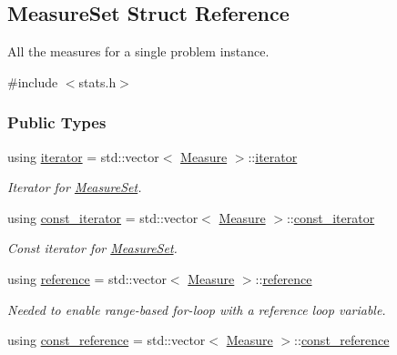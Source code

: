 \hypertarget{structMeasureSet}{}\subsection{Measure\+Set Struct Reference}
\label{structMeasureSet}


All the measures for a single problem instance.  




{\ttfamily \#include $<$stats.\+h$>$}

\subsubsection*{Public Types}
\begin{DoxyCompactItemize}
\item 
using \hyperlink{structMeasureSet_ae27132ddda27621abc1178a3fb3744b3}{iterator} = std\+::vector$<$ \hyperlink{structMeasure}{Measure} $>$\+::\hyperlink{structMeasureSet_ae27132ddda27621abc1178a3fb3744b3}{iterator}\hypertarget{structMeasureSet_ae27132ddda27621abc1178a3fb3744b3}{}\label{structMeasureSet_ae27132ddda27621abc1178a3fb3744b3}

\begin{DoxyCompactList}\small\item\em Iterator for \hyperlink{structMeasureSet}{Measure\+Set}. \end{DoxyCompactList}\item 
using \hyperlink{structMeasureSet_af26a4657a3e2a42f86409a7604f1876e}{const\+\_\+iterator} = std\+::vector$<$ \hyperlink{structMeasure}{Measure} $>$\+::\hyperlink{structMeasureSet_af26a4657a3e2a42f86409a7604f1876e}{const\+\_\+iterator}\hypertarget{structMeasureSet_af26a4657a3e2a42f86409a7604f1876e}{}\label{structMeasureSet_af26a4657a3e2a42f86409a7604f1876e}

\begin{DoxyCompactList}\small\item\em Const iterator for \hyperlink{structMeasureSet}{Measure\+Set}. \end{DoxyCompactList}\item 
using \hyperlink{structMeasureSet_ac20e7769213c1d60e0b3a08aa0ef470a}{reference} = std\+::vector$<$ \hyperlink{structMeasure}{Measure} $>$\+::\hyperlink{structMeasureSet_ac20e7769213c1d60e0b3a08aa0ef470a}{reference}\hypertarget{structMeasureSet_ac20e7769213c1d60e0b3a08aa0ef470a}{}\label{structMeasureSet_ac20e7769213c1d60e0b3a08aa0ef470a}

\begin{DoxyCompactList}\small\item\em Needed to enable range-\/based for-\/loop with a reference loop variable. \end{DoxyCompactList}\item 
using \hyperlink{structMeasureSet_aa294da3254d6c95367732ae64056b3c0}{const\+\_\+reference} = std\+::vector$<$ \hyperlink{structMeasure}{Measure} $>$\+::\hyperlink{structMeasureSet_aa294da3254d6c95367732ae64056b3c0}{const\+\_\+reference}\hypertarget{structMeasureSet_aa294da3254d6c95367732ae64056b3c0}{}\label{structMeasureSet_aa294da3254d6c95367732ae64056b3c0}


\end{DoxyCompactItemize}
